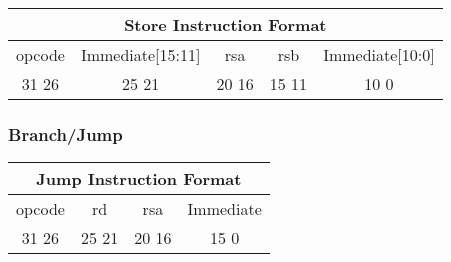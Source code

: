 \documentclass[letterpaper, 11pt]{article}
\begin{document}
\begin{center}
		\begin{tabular}{|c|c|c|c|c|}
			\multicolumn{5}{c}{Store Instruction Format}\\ \hline
				\hspace{2pt} opcode \hspace{2pt} & \hspace{5pt} Immediate[15:11] \hspace{5pt} &  \hspace{4pt} rsa \hspace{4pt} & \hspace{4pt}rsb  \hspace{4pt}& \hspace{10pt}Immediate[10:0]  \hspace{10pt}    \\	\hline
			31 \hfill 26& 25 \hfill 21 &20 \hfill  16& 15 \hfill  11&10 \hfill  0\\ \hline
		
	\end{tabular}
\end{center}
\subsubsection{Branch/Jump}

\begin{center}
		\begin{tabular}{|c|c|c|c|}
			\multicolumn{4}{c}{Jump Instruction Format}\\ \hline
				\hspace{2pt} opcode \hspace{2pt} & \hspace{5pt} rd \hspace{5pt} &  \hspace{4pt} rsa \hspace{4pt} & \hspace{10pt} Immediate  \hspace{10pt}   \\	\hline
							31 \hfill 26& 25 \hfill 21 &20 \hfill  16& 15 \hfill   0\\ \hline
		
	\end{tabular}
\end{center}	
\end{document}
